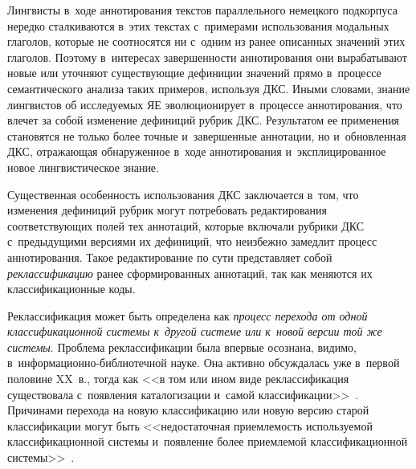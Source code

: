 \begin{multicols}{2}
     Лингвисты в~ходе аннотирования текстов параллельного немецкого 
подкорпуса нередко сталкиваются в~этих текстах с~примерами использования 
модальных глаголов, которые не соотносятся ни с~одним из ранее описанных 
значений этих глаголов. Поэтому в~интересах завершенности аннотирования 
они вырабатывают новые или уточняют существующие дефиниции значений 
прямо в~процессе семантического анализа таких примеров, используя ДКС. 
Иными словами, знание лингвистов об исследуемых ЯЕ 
эволюционирует в~процессе аннотирования, что влечет за собой изменение 
дефиниций рубрик ДКС. Результатом ее применения становятся не только 
более точные и~завершенные аннотации, но и~обновленная ДКС, отражающая 
обнаруженное в~ходе аннотирования и~эксплицированное новое 
лингвистическое знание.
     
     Существенная особенность использования ДКС заключается в~том, что 
изменения дефиниций руб\-рик могут потребовать редактирования 
соответствующих полей тех аннотаций, которые включали рубрики ДКС 
с~предыдущими версиями их дефиниций, что неизбежно замедлит процесс 
аннотирования. Такое редактирование по сути представляет собой 
\textit{реклассификацию} ранее сформированных аннотаций, так как меняются 
их классификационные коды.
     
     Реклассификация может быть определена как \textit{процесс перехода от 
одной классификационной сис\-те\-мы к~другой сис\-те\-ме или к~новой версии той 
же сис\-те\-мы}. Проблема реклассификации была впервые осознана, видимо,  
в~ин\-фор\-ма\-ци\-он\-но-биб\-лио\-теч\-ной науке. Она активно обсуждалась 
уже в~первой половине XX~в., тогда как <<в том или ином виде 
реклассификация существовала с~появления каталогизации и~самой 
классификации>>~\cite[с.~249]{16-gon}. Причинами перехода на новую 
классификацию или новую версию старой классификации могут быть 
<<недостаточная приемлемость используемой классификационной системы 
и~появление более приемлемой классификационной 
системы>>~\cite[с.~83]{17-gon}.

\begin{table*}[b]\small %
\begin{center}
\vspace*{2ex}


\end{center}
\end{table*}
\end{multicols}
